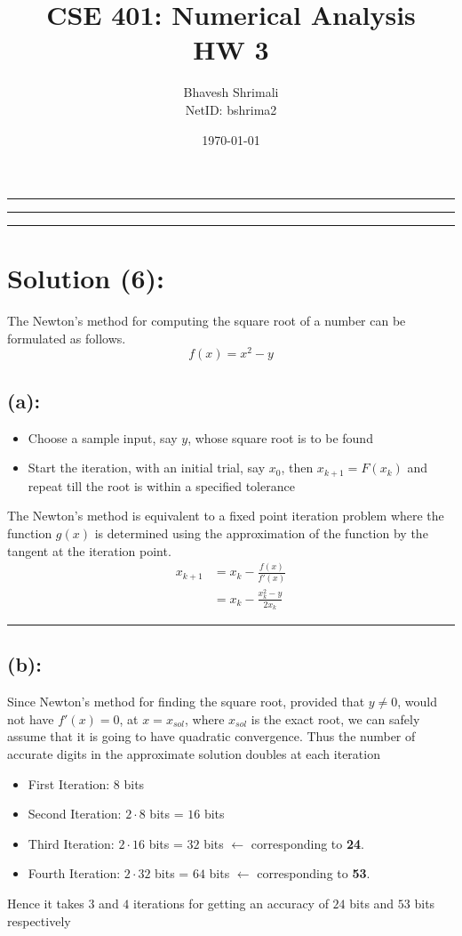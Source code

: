 
\title{\bf CSE 401: Numerical Analysis \\ HW 3}
\author{Bhavesh Shrimali \\ NetID: bshrima2}
\date{\today}
\titlespacing*{\title}{-2ex}{*-2ex}{-2ex}

\maketitle \hrule \hrule \hrule
\section*{Solution (6): }
The Newton's method for computing the square root of a number can be formulated as follows.
\[
f(x) = x^2 - y
\]
\subsection*{(a): }
\begin{itemize}
\item Choose a sample input, say $y$, whose square root is to be found 
\item Start the iteration, with an initial trial, say $x_0$, then $x_{k+1} = F(x_k)$ and repeat till the root is within a specified tolerance 
\end{itemize} 
The Newton's method is equivalent to a fixed point iteration problem where the function $g(x)$ is determined using the approximation of the function by the tangent at the iteration point. 
\begin{align*}
x_{k+1}
& =
x_k - \frac{f(x)}{f'(x)} \\ 
& = x_k - \frac{x_k^2-y}{2x_k}
\end{align*}\hrule
\subsection*{(b): }
Since Newton's method for finding the square root, provided that $y\neq 0$, would not have $f'(x) = 0$, at $x=x_{sol}$, where $x_{sol}$ is the exact root, we can safely assume that it is going to have quadratic convergence. Thus the number of accurate digits in the approximate solution doubles at each iteration
\begin{itemize}
\item First Iteration: $8$ bits
\item Second Iteration: $2\cdot 8$ bits = $16$ bits
\item Third Iteration: $2\cdot 16$ bits = $32$ bits   $\bm\leftarrow$ corresponding to {\bf 24}. 
\item Fourth Iteration: $2 \cdot 32$ bits = $64$ bits   $\bm\leftarrow$ corresponding to {\bf 53}.  
\end{itemize} 
Hence it takes $3$ and $4$ iterations for getting an accuracy of $24$ bits and $53$ bits respectively
